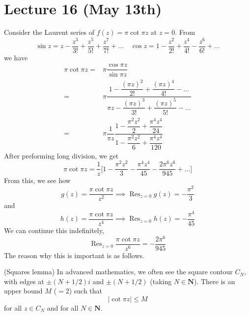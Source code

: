 \section{Lecture 16 (May 13th)}
\begin{ex}
Consider the Laurent series of $f(z)=\pi\cot \pi z$ at $z=0$. From
\[\sin z=z-\dfrac{z^3}{3!}+\dfrac{z^{5}}{5!}+\dfrac{z^{7}}{7!}+\ldots \quad \cos z=1-\dfrac{z^2}{2!}+\dfrac{z^{4}}{4!}-\dfrac{z^{6}}{6!}+\ldots \]
we have
\begin{align*}
\pi\cot \pi z=&\pi \dfrac{\cos \pi z}{\sin \pi z}\\
=&\pi \dfrac{1-\dfrac{(\pi z)^2}{2!}+\dfrac{(\pi z)^{4}}{4!}-\ldots }{\pi z-\dfrac{(\pi z)^3}{3!}+\dfrac{(\pi z)^{5}}{5!}-\ldots }\\
=&\pi \dfrac{1}{\pi z}\dfrac{1-\dfrac{\pi ^2z^2}{2}+\dfrac{\pi^{4}z^{4}}{24}}{1-\dfrac{\pi ^2z^2}{6}+\dfrac{\pi ^{4}z^{4}}{120}}
\end{align*}
After preforming long division, we get 
\[\pi \cot \pi z=\dfrac{1}{z}\Big[1-\dfrac{\pi ^2z^2}{3}-\dfrac{\pi ^{4}z^{4}}{45}-\dfrac{2\pi ^{6}z^{6}}{945}+\ldots \Big]\]
From this, we see how
\[g(z)=\dfrac{\pi \cot \pi z}{z^2}\implies \mathop{\mathrm{Res}}_{z=0}g(z)=-\dfrac{\pi ^2}{3}\]
and
\[h(z)=\dfrac{\pi\cot \pi z}{z^{4}}\implies \mathop{\mathrm{Res}}_{z=0}h(z)=-\dfrac{\pi ^{4}}{45}\]
We can continue this indefinitely,
\[\mathop{\mathrm{Res}}_{z=0}\dfrac{\pi \cot \pi z}{z^{6}}=-\dfrac{2\pi ^{6}}{945}\]
The reason why this is important is as follows. 
\end{ex}
\vspace{2ex}
\begin{defi}
(Squares lemma)
In advanced mathematics, we often see the square contour $C_{N}$, with edges at $\pm(N+1/2)i$ and $\pm (N+1/2)$ (taking $N\in {\bm N}$). There is an upper bound $M$ ($=2$) such that 
\[| \cot \pi z|\leq M\]
for all $z\in C_{N}$ and for all $N\in {\bm N}$. 
\end{defi}
\vspace{2ex}

